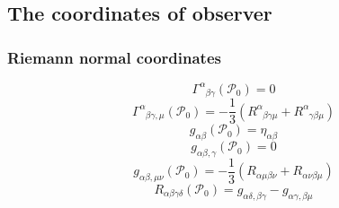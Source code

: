 \documentclass{article}
\begin{document}
\subsection{The coordinates of observer}
\subsubsection{Riemann normal coordinates}
\[\Gamma^{\alpha}_{\phantom{\alpha} \beta \gamma}(\mathcal{P}_0) = 0\]
\[\Gamma^{\alpha}_{\phantom{\alpha} \beta \gamma,\mu}(\mathcal{P}_0) = -\frac{1}{3} (R^{\alpha}_{\phantom{\alpha} \beta \gamma \mu} + R^{\alpha}_{\phantom{\alpha} \gamma \beta \mu})\]
\[g_{\alpha \beta}(\mathcal{P}_0) = \eta_{\alpha \beta}\]
\[g_{\alpha \beta,\gamma}(\mathcal{P}_0) = 0\]
\[g_{\alpha \beta,\mu \nu}(\mathcal{P}_0) = -\frac{1}{3} (R_{\alpha \mu \beta \nu} +R_{\alpha \nu \beta \mu})\]
\[R_{\alpha \beta \gamma \delta}(\mathcal{P}_0) = g_{\alpha \delta, \beta \gamma} - g_{\alpha \gamma , \beta \mu}\]
\end{document}

